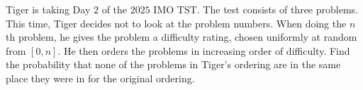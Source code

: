 Tiger is taking Day $2$ of the $2025$ IMO TST. The test consists of three problems. This time, Tiger decides not to look at the problem numbers. When doing the $n$th problem, he gives the problem a difficulty rating, chosen uniformly at random from $[0,n]$. He then orders the problems in increasing order of difficulty. Find the probability that none of the problems in Tiger's ordering are in the same place they were in for the original ordering.
